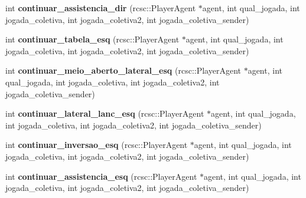 \begin{DoxyCompactItemize}
\item 
\hypertarget{classBhv__SetPlay_aa73ab52c84c79d7a44b283816623167a}{
int {\bfseries continuar\_\-assistencia\_\-dir} (rcsc::PlayerAgent $\ast$agent, int qual\_\-jogada, int jogada\_\-coletiva, int jogada\_\-coletiva2, int jogada\_\-coletiva\_\-sender)}
\label{classBhv__SetPlay_aa73ab52c84c79d7a44b283816623167a}

\item 
\hypertarget{classBhv__SetPlay_a9d9c247be76e733a57aff516c3b3dbae}{
int {\bfseries continuar\_\-tabela\_\-esq} (rcsc::PlayerAgent $\ast$agent, int qual\_\-jogada, int jogada\_\-coletiva, int jogada\_\-coletiva2, int jogada\_\-coletiva\_\-sender)}
\label{classBhv__SetPlay_a9d9c247be76e733a57aff516c3b3dbae}

\item 
\hypertarget{classBhv__SetPlay_ac701c63954fdc7bc9dd2584a765acf03}{
int {\bfseries continuar\_\-meio\_\-aberto\_\-lateral\_\-esq} (rcsc::PlayerAgent $\ast$agent, int qual\_\-jogada, int jogada\_\-coletiva, int jogada\_\-coletiva2, int jogada\_\-coletiva\_\-sender)}
\label{classBhv__SetPlay_ac701c63954fdc7bc9dd2584a765acf03}

\item 
\hypertarget{classBhv__SetPlay_afee7baa90394e47ab1bf533e5a70c22f}{
int {\bfseries continuar\_\-lateral\_\-lanc\_\-esq} (rcsc::PlayerAgent $\ast$agent, int qual\_\-jogada, int jogada\_\-coletiva, int jogada\_\-coletiva2, int jogada\_\-coletiva\_\-sender)}
\label{classBhv__SetPlay_afee7baa90394e47ab1bf533e5a70c22f}

\item 
\hypertarget{classBhv__SetPlay_ab1de3b0cf6d0aecd872ac4a226b7e75d}{
int {\bfseries continuar\_\-inversao\_\-esq} (rcsc::PlayerAgent $\ast$agent, int qual\_\-jogada, int jogada\_\-coletiva, int jogada\_\-coletiva2, int jogada\_\-coletiva\_\-sender)}
\label{classBhv__SetPlay_ab1de3b0cf6d0aecd872ac4a226b7e75d}

\item 
\hypertarget{classBhv__SetPlay_ab991b7aa5bf95e8e59c2e02c011229c7}{
int {\bfseries continuar\_\-assistencia\_\-esq} (rcsc::PlayerAgent $\ast$agent, int qual\_\-jogada, int jogada\_\-coletiva, int jogada\_\-coletiva2, int jogada\_\-coletiva\_\-sender)}
\label{classBhv__SetPlay_ab991b7aa5bf95e8e59c2e02c011229c7}

\end{DoxyCompactItemize}
